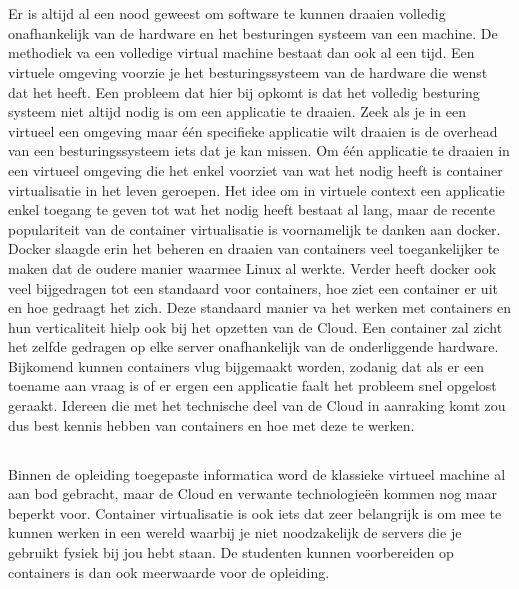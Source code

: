 
\chapter{}
\label{ch:inleiding}

Er is altijd al een nood geweest om software te kunnen draaien volledig onafhankelijk van de hardware en het besturingen systeem van een machine. De methodiek va een volledige virtual machine bestaat dan ook al een tijd. Een virtuele omgeving voorzie je het besturingssysteem van de hardware die wenst dat het heeft. Een probleem dat hier bij opkomt is dat het volledig besturing systeem niet altijd nodig is om een applicatie te draaien.  Zeek als je in een virtueel een omgeving maar één specifieke applicatie wilt draaien is de overhead van een besturingssysteem iets dat je kan missen.  Om één applicatie te draaien in een virtueel omgeving die het enkel voorziet van wat het nodig heeft is container virtualisatie in het leven geroepen. 
Het idee om in virtuele context een applicatie enkel toegang te geven tot wat het nodig heeft bestaat al lang, maar de recente populariteit van de container virtualisatie is voornamelijk te danken aan docker.  Docker slaagde erin het beheren en draaien van containers veel toegankelijker te maken dat de oudere manier waarmee Linux al werkte.  Verder heeft docker ook veel bijgedragen tot een standaard voor containers, hoe ziet een container er uit en hoe gedraagt het zich.  Deze standaard manier va het werken met containers en hun verticaliteit hielp ook bij het opzetten van de Cloud. Een container zal zicht het zelfde gedragen op elke server onafhankelijk van de onderliggende hardware. Bijkomend kunnen containers vlug bijgemaakt worden, zodanig dat als er een toename aan vraag is of er ergen een applicatie faalt het probleem snel opgelost geraakt. Idereen die met het technische deel van de Cloud in aanraking komt zou dus best kennis hebben van containers en hoe met deze te werken.


\section{}
\label{sec:probleemstelling}

Binnen de opleiding toegepaste informatica word de klassieke virtueel machine al aan bod gebracht, maar de Cloud en verwante technologieën kommen nog maar beperkt voor. Container virtualisatie is ook  iets dat zeer belangrijk is om mee te kunnen werken in een wereld waarbij je niet noodzakelijk de servers die je gebruikt fysiek bij jou hebt staan. De studenten kunnen voorbereiden op containers is dan ook meerwaarde voor de opleiding. 

